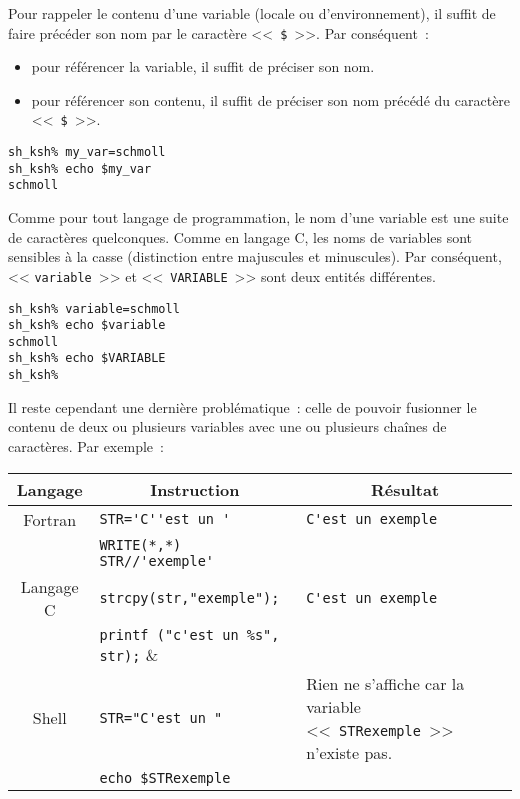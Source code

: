 Pour rappeler le contenu d'une variable
(locale ou d'environnement), il suffit de faire pr{\'e}c{\'e}der son nom
par le caract{\`e}re <<~\texttt{\$}~>>. Par cons{\'e}quent~:
\begin{itemize}
	\item pour r{\'e}f{\'e}rencer la variable, il suffit de pr{\'e}ciser son nom.
	\item pour r{\'e}f{\'e}rencer son contenu, il suffit de pr{\'e}ciser son nom pr{\'e}c{\'e}d{\'e} du
		  caract{\`e}re <<~\texttt{\$}~>>.
\end{itemize}

\begin{example}
\begin{verbatim}
sh_ksh% my_var=schmoll
sh_ksh% echo $my_var
schmoll
\end{verbatim}
\end{example}

Comme pour tout langage de programmation, le nom d'une variable est une suite de caract\`{e}res
quelconques. Comme en langage C, les noms de variables sont sensibles \`{a} la casse (distinction entre
majuscules et minuscules). Par cons\'{e}quent, << \texttt{variable}~>> et <<~\texttt{VARIABLE}~>>
sont deux entit\'{e}s diff\'{e}rentes.
\begin{example}
\begin{verbatim}
sh_ksh% variable=schmoll
sh_ksh% echo $variable
schmoll
sh_ksh% echo $VARIABLE
sh_ksh% 
\end{verbatim}
\end{example}

Il reste cependant une derni\`{e}re probl\'{e}matique~: celle de pouvoir fusionner le contenu de
deux ou plusieurs variables avec une ou plusieurs cha\^{i}nes de caract\`{e}res. Par exemple~:

\begin{tabular}{|c|l|p{5cm}|}
	Langage			& \multicolumn{1}{|c|}{Instruction}
					& \multicolumn{1}{|c|}{R\'{e}sultat}			\\[2ex]
	\hline \hline
	Fortran			& \verb:STR='C''est un ':				&	\verb,C'est un exemple,						\\
					& \verb:WRITE(*,*) STR//'exemple':		&												\\[2ex]
	\hline
	Langage C		& \verb:strcpy(str,"exemple");:			&	\verb,C'est un exemple,						\\
					& \verb:printf ("c'est un %s", str);:	&												\\[2ex]
	\hline
	Shell {\Unix}	& \verb:STR="C'est un ":				&	Rien ne s'affiche car la variable
															    <<~\texttt{STRexemple}~>> n'existe pas.		\\
					& \texttt{echo \$STRexemple}			& \\[2ex]
	\hline
\end{tabular}

